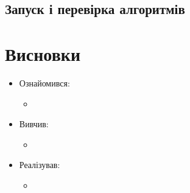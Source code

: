 \documentclass[\mainDocument]{subfiles}
\begin{document}
	\section{Запуск і перевірка алгоритмів}

	\chapter{Висновки}
	\begin{itemize}
		\item Ознайомився:
			\begin{itemize}
				\item
			\end{itemize}
		\item Вивчив:
			\begin{itemize}
				\item
			\end{itemize}
		\item Реалізував:
			\begin{itemize}
				\item
			\end{itemize}
	\end{itemize}
\end{document}
